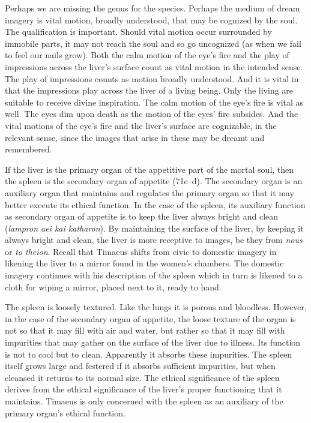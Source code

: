 Perhaps we are missing the genus for the species. Perhaps the medium of dream imagery is vital motion, broadly understood, that may be cognized by the soul. The qualification is important. Should vital motion occur surrounded by immobile parts, it may not reach the soul and so go uncognized (as when we fail to feel our nails grow). Both the calm motion of the eye's fire and the play of impressions across the liver's surface count as vital motion in the intended sense. The play of impressions counts as motion broadly understood. And it is vital in that the impressions play across the liver of a living being. Only the living are suitable to receive divine inspiration. The calm motion of the eye's fire is vital as well. The eyes dim upon death as the motion of the eyes' fire subsides. And the vital motions of the eye's fire and the liver's surface are cognizable, in the relevant sense, since the images that arise in these may be dreamt and remembered.

If the liver is the primary organ of the appetitive part of the mortal soul, then the spleen is the secondary organ of appetite (71c--d). The secondary organ is an auxiliary organ that maintains and regulates the primary organ so that it may better execute its ethical function. In the case of the spleen, its auxiliary function as secondary organ of appetite is to keep the liver always bright and clean (\emph{lampron aei kai katharon}). By maintaining the surface of the liver, by keeping it always bright and clean, the liver is more receptive to images, be they from \emph{nous} or \emph{to theion}. Recall that Timaeus shifts from civic to domestic imagery in likening the liver to a mirror found in the women's chambers. The domestic imagery continues with his description of the spleen which in turn is likened to a cloth for wiping a mirror, placed next to it, ready to hand.

The spleen is loosely textured. Like the lungs it is porous and bloodless. However, in the case of the secondary organ of appetite, the loose texture of the organ is not so that it may fill with air and water, but rather so that it may fill with impurities that may gather on the surface of the liver due to illness. Its function is not to cool but to clean. Apparently it absorbs these impurities. The spleen itself grows large and festered if it absorbs sufficient impurities, but when cleansed it returns to its normal size. The ethical significance of the spleen derives from the ethical significance of the liver's proper functioning that it maintains. Timaeus is only concerned with the spleen as an auxiliary of the primary organ's ethical function.

